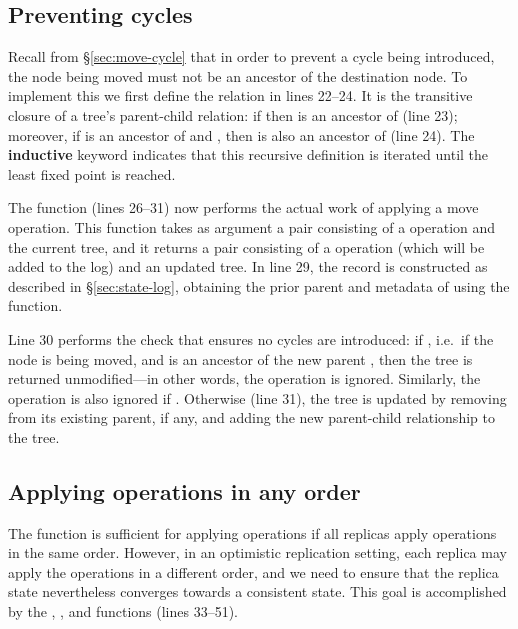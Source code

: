 \documentclass[sigplan,anonymous]{acmart}
\begin{document}
\subsection{Preventing cycles}\label{sec:prevent-cycles}

Recall from \S\ref{sec:move-cycle} that in order to prevent a cycle being introduced, the node being moved must not be an ancestor of the destination node.
To implement this we first define the  relation in lines 22--24.
It is the transitive closure of a tree's parent-child relation: if  then  is an ancestor of  (line 23); moreover, if  is an ancestor of  and , then  is also an ancestor of  (line 24).
The \textbf{inductive} keyword indicates that this recursive definition is iterated until the least fixed point is reached.

The  function (lines 26--31) now performs the actual work of applying a move operation.
This function takes as argument a pair consisting of a  operation and the current tree, and it returns a pair consisting of a  operation (which will be added to the log) and an updated tree.
In line 29, the  record is constructed as described in \S\ref{sec:state-log}, obtaining the prior parent and metadata of  using the  function.

Line 30 performs the check that ensures no cycles are introduced: if , i.e.\ if the node  is being moved, and  is an ancestor of the new parent , then the tree is returned unmodified---in other words, the operation is ignored.
Similarly, the operation is also ignored if .
Otherwise (line 31), the tree is updated by removing  from its existing parent, if any, and adding the new parent-child relationship  to the tree.

\subsection{Applying operations in any order}\label{sec:applying}

The  function is sufficient for applying operations if all replicas apply operations in the same order.
However, in an optimistic replication setting, each replica may apply the operations in a different order, and we need to ensure that the replica state nevertheless converges towards a consistent state.
This goal is accomplished by the , , and  functions (lines 33--51).
\end{document}
